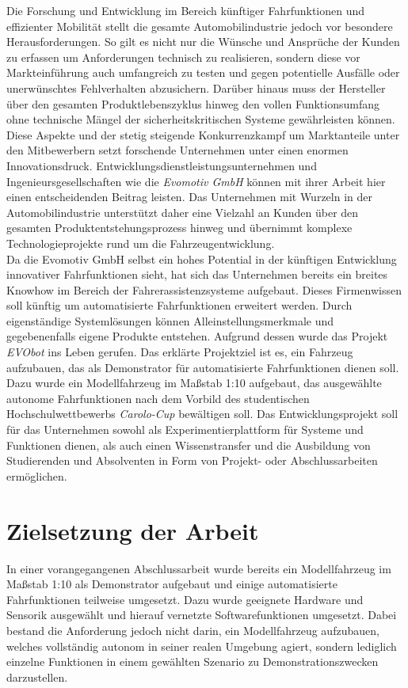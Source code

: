 Die Forschung und Entwicklung im Bereich künftiger Fahrfunktionen und effizienter Mobilität stellt die gesamte Automobilindustrie jedoch vor besondere Herausforderungen. So gilt es nicht nur die Wünsche und Ansprüche der Kunden zu erfassen um Anforderungen technisch zu realisieren, sondern diese vor Markteinführung auch umfangreich zu testen und gegen potentielle Ausfälle oder unerwünschtes Fehlverhalten abzusichern. Darüber hinaus muss der Hersteller über den gesamten Produktlebenszyklus hinweg den vollen Funktionsumfang ohne technische Mängel der sicherheitskritischen Systeme gewährleisten können. Diese Aspekte und der stetig steigende Konkurrenzkampf um Marktanteile unter den Mitbewerbern setzt forschende Unternehmen unter einen enormen Innovationsdruck. Entwicklungsdienstleistungsunternehmen und Ingenieursgesellschaften wie die \emph{Evomotiv GmbH} können mit ihrer Arbeit hier einen entscheidenden Beitrag leisten. Das Unternehmen mit Wurzeln in der Automobilindustrie unterstützt daher eine Vielzahl an Kunden über den gesamten Produktentstehungsprozess hinweg und übernimmt komplexe Technologieprojekte rund um die Fahrzeugentwicklung.\\
Da die Evomotiv GmbH selbst ein hohes Potential in der künftigen Entwicklung innovativer Fahrfunktionen sieht, hat sich das Unternehmen bereits ein breites Knowhow im Bereich der Fahrerassistenzsysteme aufgebaut. Dieses Firmenwissen soll künftig um automatisierte Fahrfunktionen erweitert werden. Durch eigenständige Systemlösungen können Alleinstellungsmerkmale und gegebenenfalls eigene Produkte entstehen. Aufgrund dessen wurde das Projekt \emph{EVObot} ins Leben gerufen. Das erklärte Projektziel ist es, ein Fahrzeug aufzubauen, das als Demonstrator für automatisierte Fahrfunktionen dienen soll. Dazu wurde ein Modellfahrzeug im Maßstab 1:10 aufgebaut, das ausgewählte autonome Fahrfunktionen nach dem Vorbild des studentischen Hochschulwettbewerbs \emph{Carolo-Cup} \cite{TechnischeUniversitatBraunschweig.} bewältigen soll. Das Entwicklungsprojekt soll für das Unternehmen sowohl als Experimentierplattform für Systeme und Funktionen dienen, als auch einen Wissenstransfer und die Ausbildung von Studierenden und Absolventen in Form von Projekt- oder Abschlussarbeiten ermöglichen.

\section{Zielsetzung der Arbeit} \label{sec:aufgabenstellung}
In einer vorangegangenen Abschlussarbeit \cite{Fitzer.31.03.2018} wurde bereits ein Modellfahrzeug im Maßstab 1:10 als Demonstrator aufgebaut und einige automatisierte Fahrfunktionen teilweise umgesetzt. Dazu wurde geeignete Hardware und Sensorik ausgewählt und hierauf vernetzte Softwarefunktionen umgesetzt. Dabei bestand die Anforderung jedoch nicht darin, ein Modellfahrzeug aufzubauen, welches vollständig autonom in seiner realen Umgebung agiert, sondern lediglich einzelne Funktionen in einem gewählten Szenario zu Demonstrationszwecken darzustellen.


